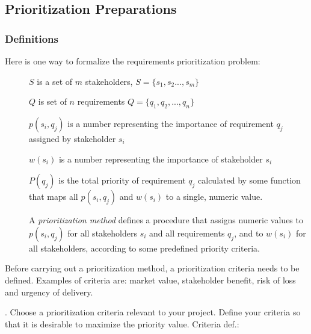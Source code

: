 \documentclass[11pt]{article}
\begin{document}
\subsection{Prioritization Preparations}

\subsubsection{Definitions}

Here is one way to formalize the requirements prioritization problem: 
\begin{description}
\item [] $S$ is a set of $m$ stakeholders, $S=\{s_1, s_2 ..., s_m\}$
\item [] $Q$ is set of $n$ requirements $Q=\{q_1, q_2, ..., q_n\}$
\item [] $p(s_i, q_j)$ is a number representing the importance of requirement $q_j$ assigned by stakeholder $s_i$
\item [] $w(s_i)$ is a number representing the importance of stakeholder $s_i$
\item [] $P(q_j)$ is the total priority of requirement $q_j$ calculated by some function that maps all $p(s_i, q_j)$ and $w(s_i)$ to a single, numeric value.
\item[] A {\it prioritization method} defines a procedure that assigns numeric values to $p(s_i, q_j)$ for all stakeholders $s_i$ and all requirements $q_j$, and to $w(s_i)$ for all stakeholders, according to some predefined priority criteria.  
\end{description}

\noindent Before carrying out a prioritization method, a prioritization criteria needs to be defined. Examples of criteria are: market value, stakeholder benefit, risk of loss and urgency of delivery. 

\begin{framed}
. Choose a prioritization criteria relevant to your project. Define your criteria so that it is desirable to maximize the priority value. 
\newline\newline Criteria def.: \underline{\hspace{10cm}}
 \end{framed}
 
\end{document}
